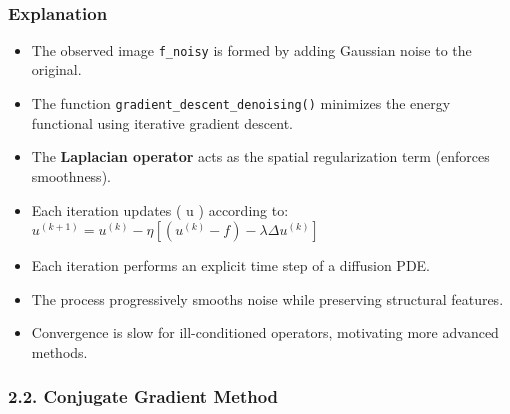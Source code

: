 \documentclass[11pt]{article}
\providecommand{\tightlist}{%
      \setlength{\itemsep}{0pt}\setlength{\parskip}{0pt}}
\begin{document}
    \begin{center}
    \end{center}
    { \hspace*{\fill} \\}
    
    \hypertarget{explanation}{%
\subsubsection{\texorpdfstring{\textbf{Explanation}}{Explanation}}\label{explanation}}

\begin{itemize}
\tightlist
\item
  The observed image \texttt{f\_noisy} is formed by adding Gaussian
  noise to the original.
\item
  The function \texttt{gradient\_descent\_denoising()} minimizes the
  energy functional using iterative gradient descent.
\item
  The \textbf{Laplacian operator} acts as the spatial regularization
  term (enforces smoothness).
\item
  Each iteration updates ( u ) according to:
  \(u^{(k+1)} = u^{(k)} - \eta [(u^{(k)} - f) - \lambda \Delta u^{(k)}]\)
\item
  Each iteration performs an explicit time step of a diffusion PDE.
\item
  The process progressively smooths noise while preserving structural
  features.
\item
  Convergence is slow for ill-conditioned operators, motivating more
  advanced methods.
\end{itemize}

    \hypertarget{conjugate-gradient-method}{%
\subsubsection{\texorpdfstring{\textbf{2.2. Conjugate Gradient
Method}}{2.2. Conjugate Gradient Method}}\label{conjugate-gradient-method}}
\end{document}

